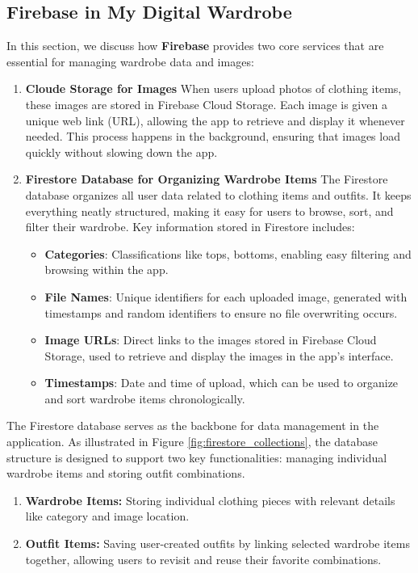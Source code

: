 \subsection{Firebase in My Digital Wardrobe}
In this section, we discuss how \textbf{Firebase} provides two core services that are essential for managing wardrobe data and images:
\begin{enumerate}
    \item \textbf{Cloude Storage for Images}
    When users upload photos of clothing items, these images are stored in Firebase Cloud Storage. Each image is given a unique web link (URL), allowing the app to retrieve and display it whenever needed. This process happens in the background, ensuring that images load quickly without slowing down the app.
    \item \textbf{Firestore Database for Organizing Wardrobe Items}
    The Firestore database organizes all user data related to clothing items and outfits. It keeps everything neatly structured, making it easy for users to browse, sort, and filter their wardrobe. Key information stored in Firestore includes:
   
    \begin{itemize}
        \item \textbf{Categories}: Classifications like tops, bottoms,  enabling easy filtering and browsing within the app.
        \item \textbf{File Names}: Unique identifiers for each uploaded image, generated with timestamps and random identifiers to ensure no file overwriting occurs.
        \item \textbf{Image URLs}: Direct links to the images stored in Firebase Cloud Storage, used to retrieve and display the images in the app’s interface.
        \item \textbf{Timestamps}: Date and time of upload, which can be used to organize and sort wardrobe items chronologically.
    \end{itemize}
\end{enumerate}


The Firestore database serves as the backbone for data management in the application. As illustrated in Figure \ref{fig:firestore_collections}, the database structure is designed to support two key functionalities: managing individual wardrobe items and storing outfit combinations. 
\begin{enumerate}
    \item \textbf{Wardrobe Items:} Storing individual clothing pieces with relevant details like category and image location.
    \item \textbf{Outfit Items:} Saving user-created outfits by linking selected wardrobe items together, allowing users to revisit and reuse their favorite combinations.
\end{enumerate}


